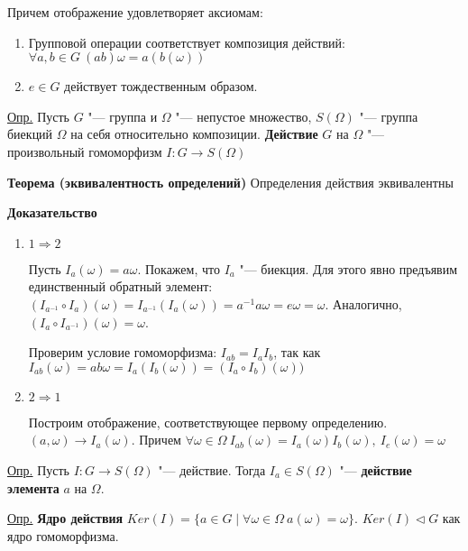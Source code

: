 \documentclass{article}
\begin{document}
Причем отображение удовлетворяет аксиомам:
\begin{enumerate}
	\item Групповой операции соответствует композиция действий: $\forall a,b \in G \  (ab)\omega = a(b(\omega))$
	\item $e \in G$ действует тождественным образом.
\end{enumerate}

\underline{Опр.} Пусть $G$ "--- группа и $\Omega$ "--- непустое множество, $S(\Omega)$ "--- группа биекций $\Omega$ на себя относительно композиции. \textbf{Действие} $G$ на $\Omega$ "--- произвольный гомоморфизм $I: G \rightarrow S(\Omega)$

\vspace{10pt}

\textbf{Теорема (эквивалентность определений)}
Определения действия эквивалентны

\textbf{Доказательство}
\begin{enumerate}
	\item $1 \Rightarrow 2$
	
	Пусть $I_a(\omega) = a\omega$. Покажем, что $I_a$ "--- биекция. Для этого явно предъявим единственный обратный элемент: $(I_{a^{-1}} \circ I_a)(\omega) = I_{a^{-1}}(I_a(\omega)) = a^{-1}a\omega = e\omega = \omega$. Аналогично, $(I_a \circ I_{a^{-1}})(\omega) = \omega$.
	
	Проверим условие гомоморфизма: $I_{ab} = I_aI_b$, так как $I_{ab}(\omega) = ab\omega = I_a(I_b(\omega)) = (I_a \circ I_b)(\omega))$
	
	\item $2 \Rightarrow 1$
	
	Построим отображение, соответствующее первому определению. $(a, \omega) \rightarrow I_a(\omega)$. Причем $\forall \omega \in \Omega \  I_{ab}(\omega) = I_a(\omega)I_b(\omega), \  I_e(\omega) = \omega$ 
\end{enumerate}

\vspace{10pt}

\underline{Опр.} Пусть $I: G \rightarrow S(\Omega)$ "--- действие. Тогда $I_a \in S(\Omega)$ "--- \textbf{действие элемента} $a$ на $\Omega$.

\vspace{5pt}

\underline{Опр.} \textbf{Ядро действия} $Ker(I) = \{a \in G \mid \forall \omega \in \Omega \  a(\omega) = \omega \}$. $Ker(I) \triangleleft G$ как ядро гомоморфизма.
\end{document}
